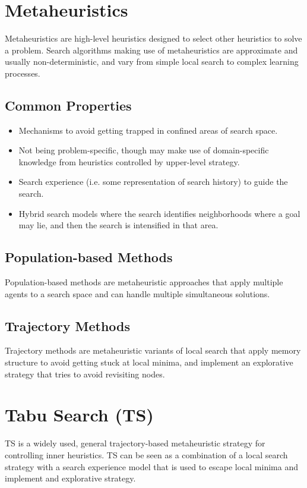 \documentclass[12pt,titlepage]{article}
\begin{document}
  \newpage

  \section{Metaheuristics}
    Metaheuristics are high-level heuristics designed to select other heuristics to solve a problem. Search algorithms making use of metaheuristics are approximate
    and usually non-deterministic, and vary from simple local search to complex learning processes.

    \subsection{Common Properties}
      \begin{itemize}
        \item Mechanisms to avoid getting trapped in confined areas of search space.
        \item Not being problem-specific, though may make use of domain-specific knowledge from heuristics controlled by upper-level strategy.
        \item Search experience (i.e. some representation of search history) to guide the search.
        \item Hybrid search models where the search identifies neighborhoods where a goal may lie, and then the search is intensified in that area.
      \end{itemize}

    \subsection{Population-based Methods}
      Population-based methods are metaheuristic approaches that apply multiple agents to a search space and can handle multiple simultaneous solutions.

    \subsection{Trajectory Methods}
      Trajectory methods are metaheuristic variants of local search that apply memory structure to avoid getting stuck at local minima, and implement an explorative
      strategy that tries to avoid revisiting nodes.

  \newpage

  \section{Tabu Search (TS)}
    TS is a widely used, general trajectory-based metaheuristic strategy for controlling inner heuristics. TS can be seen as a combination of a local search strategy with a search experience
    model that is used to escape local minima and implement and explorative strategy.
\end{document}
